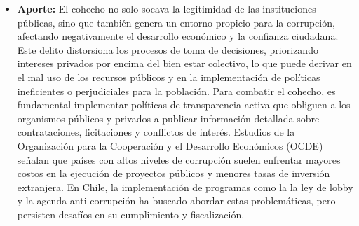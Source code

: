\documentclass[letter,12pt]{article}
\begin{document}
\begin{itemize}
		\item \textbf{Aporte: }El cohecho no solo socava la legitimidad de las instituciones públicas, sino que también genera un entorno propicio para la corrupción, afectando negativamente el desarrollo económico y la confianza ciudadana. Este delito distorsiona los procesos de toma de decisiones, priorizando intereses privados por encima del bien estar colectivo, lo que puede derivar en el mal uso de los recursos públicos y en la implementación de políticas ineficientes o perjudiciales para la población. Para combatir el cohecho, es fundamental implementar políticas de transparencia activa que obliguen a los organismos públicos y privados a publicar información detallada sobre contrataciones, licitaciones y conflictos de interés. Estudios de la Organización para la Cooperación y el Desarrollo Económicos (OCDE) señalan que países con altos niveles de corrupción suelen enfrentar mayores costos en la ejecución de proyectos públicos y menores tasas de inversión extranjera. En Chile, la implementación de programas como la la ley de lobby y la agenda anti corrupción ha buscado abordar estas problemáticas, pero persisten desafíos en su cumplimiento y fiscalización.\\
	\end{itemize}
	
\end{document}
